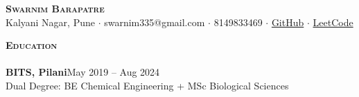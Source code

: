 \documentclass[a4paper]{article}
\newcommand{\lineunder} {
\vspace*{-8pt} \\
\hspace*{-18pt} \hrulefill \\
}
\newcommand{\header}[1]{%
{\hspace*{-18pt}\vspace*{6pt} \textsc{\textbf{\Large{#1}}}}%
\vspace*{-6pt} \lineunder
}
\begin{document}
\vspace*{-40pt}

\vspace*{-10pt}
\begin{center}
{\Huge \scshape \textbf {Swarnim Barapatre}}\\
Kalyani Nagar, Pune $\cdot$ swarnim335@gmail.com $\cdot$ 8149833469 $\cdot$ \href{https://github.com/swarnimcodes/}{GitHub} $\cdot$ \href{https://leetcode.com/u/swarnimcodes/}{LeetCode} \\
\end{center}

\header{Education}

{\textbf{BITS, Pilani}}\hfill May 2019 -- Aug 2024\\
Dual Degree: BE Chemical Engineering + MSc Biological Sciences %

\vspace{4mm}
\end{document}
